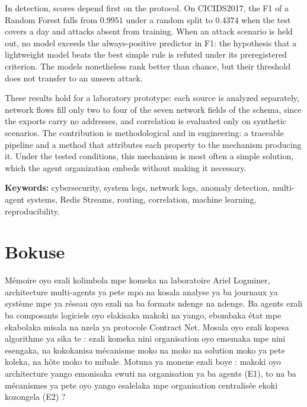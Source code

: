 \documentclass[12pt,a4paper,oneside]{report}
\newcommand{\logminer}{Logminer}
\begin{document}
In detection, scores depend first on the protocol. On CICIDS2017, the F1 of a Random Forest falls from $0.9951$ under a random split to $0.4374$ when the test covers a day and attacks absent from training. When an attack scenario is held out, no model exceeds the always-positive predictor in F1: the hypothesis that a lightweight model beats the best simple rule is refuted under its preregistered criterion. The models nonetheless rank better than chance, but their threshold does not transfer to an unseen attack.

These results hold for a laboratory prototype: each source is analyzed separately, network flows fill only two to four of the seven network fields of the schema, since the exports carry no addresses, and correlation is evaluated only on synthetic scenarios. The contribution is methodological and in engineering: a traceable pipeline and a method that attributes each property to the mechanism producing it. Under the tested conditions, this mechanism is most often a simple solution, which the agent organization embeds without making it necessary.

\bigskip

\noindent
\textbf{Keywords:}
cybersecurity, system logs, network logs, anomaly detection,
multi-agent systems, Redis Streams, routing, correlation,
machine learning, reproducibility.


\chapter*{Bokuse}


Mémoire oyo ezali kolimbola mpe komeka na laboratoire Ariel \logminer{},
architecture multi-agents ya pete mpo na kosala analyse ya ba journaux
ya système mpe ya réseau oyo ezali na ba formats ndenge na ndenge. Ba
agents ezali ba composants logiciels oyo elakisaka makoki na yango,
ebombaka état mpe ekabolaka misala na nzela ya protocole Contract Net.
Mosala oyo ezali kopesa algorithme ya sika te : ezali komeka nini
organisation oyo ememaka mpe nini esengaka, na kokokanisa mécanisme moko
na moko na solution moko ya pete koleka, na hôte moko to mibale.
Motuna ya monene ezali boye : makoki oyo architecture yango emonisaka
ewuti na organisation ya ba agents (E1), to na ba mécanismes ya pete oyo
yango esalelaka mpe organisation centralisée ekoki kozongela (E2) ?
\end{document}
